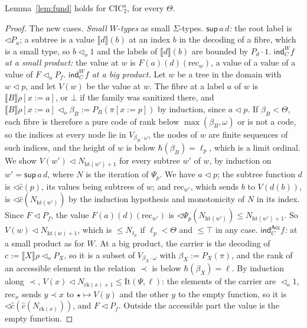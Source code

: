 \documentclass[10pt]{article}
\newcommand{\CIC}{\mathrm{CIC}}
\newcommand{\sem}[1]{\llbracket #1\rrbracket}
\newcommand{\ind}{\mathsf{ind}}
\newcommand{\Acc}{\mathsf{Acc}}
\begin{document}
\begin{lemma}\label{lem:fund2}
Lemma~\ref{lem:fund} holds for $\CIC_2^{\mathrm s}$, for every $\Theta$.
\end{lemma}
\begin{proof}
The new cases. \emph{Small $W$-types} as small $\Sigma$-types.
\emph{$\mathsf{sup}\,a\,d$:} the root label is $\lhd P_a$; a subtree is a
value $\sem d(b)$ at an index $b$ in the decoding of a fibre, which is a
small type, so $b\lhd_o1$ and the labels of $\sem d(b)$ are bounded by
$P_d\cdot1$.
\emph{$\ind^W_Cf$ at a small product:} the value at $w$ is
$F(a)(d)(\mathrm{rec}_w)$, a value of a value of a value of $F\lhd_oP_f$.
\emph{$\ind^W_Cf$ at a big product.} Let $w$ be a tree in the domain with
$w\lhd p$, and let $V(w)$ be the value at $w$. The fibre at a label $a$
of $w$ is $\sem B\rho[x{:=}a]$, or $\bot$ if the family was sanitized
there, and $\sem B\rho[x{:=}a]\lhd_o\beta_B:=P_B(\pi[x{:=}p])$ by induction,
since $a\lhd p$. If $\beta_B<\Theta$, each fibre is therefore a pure code
of rank below $\max(\beta_B,\omega)$ or is not a code, so the indices at
every node lie in $V_{\beta_B\cdot\omega}$, the nodes of $w$ are finite
sequences of such indices, and the height of $w$ is below
$\hbar(\beta_B)=\ell_p$, which is a limit ordinal. We show
$V(w')\lhd N_{\mathrm{ht}(w')+1}$ for every subtree $w'$ of $w$, by
induction on $w'=\mathsf{sup}\,a\,d$, where $N$ is the iteration of
$\Psi_p$. We have $a\lhd p$; the subtree function $d$ is
$\lhd\hat c(p)$, its values being subtrees of $w$; and $\mathrm{rec}_{w'}$,
which sends $b$ to $V(d(b))$, is $\lhd\hat c(N_{\mathrm{ht}(w')})$ by the
induction hypothesis and monotonicity of $N$ in its index. Since
$F\lhd P_f$, the value $F(a)(d)(\mathrm{rec}_{w'})$ is
$\lhd\Psi_p(N_{\mathrm{ht}(w')})\le N_{\mathrm{ht}(w')+1}$. So
$V(w)\lhd N_{\mathrm{ht}(w)+1}$, which is $\le N_{\ell_p}$ if
$\ell_p<\Theta$ and $\le\top$ in any case.
\emph{$\ind^{\Acc}_Cf$:} at a small product as for $W$. At a big product,
the carrier is the decoding of $c:=\sem X\rho\lhd_oP_X$, so it is a subset
of $V_{\beta_X\cdot\omega}$ with $\beta_X:=P_X(\pi)$, and the rank of an
accessible element in the relation $\prec$ is below $\hbar(\beta_X)=\ell$.
By induction along $\prec$, $V(x)\lhd N_{\mathrm{rk}(x)+1}\le\mathrm{It}(\Psi,\ell)$: the elements
of the carrier are $\lhd_o1$, $\mathrm{rec}_x$ sends $y\prec x$ to
$\star\mapsto V(y)$ and the other $y$ to the empty function, so it is
$\lhd\hat c(\hat c(N_{\mathrm{rk}(x)}))$, and $F\lhd P_f$. Outside the
accessible part the value is the empty function.
\end{proof}
\end{document}
